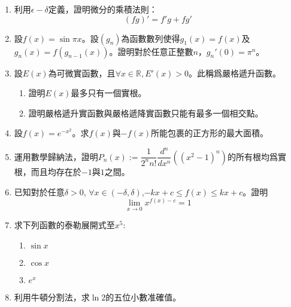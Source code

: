 \documentclass[12pt]{article}
\begin{document}
    \begin{enumerate}
        \item 利用$\epsilon-\delta$定義，證明微分的乘積法則：$$(fg)'=f'g+fg'$$
        \item 設$f(x)=\sin{\pi x}$。設$(g_n)$為函數數列使得$g_1(x)=f(x)$及$g_n(x)=f(g_{n-1}(x))$。證明對於任意正整數$n$，$g_n'(0)=\pi^n$。
        \item 設$E(x)$為可微實函數，且$\forall x\in \mathbb{R}, E'(x)>0$。此稱爲嚴格遞升函數。\begin{enumerate}
            \item 證明$E(x)$最多只有一個實根。
            \item 證明嚴格遞升實函數與嚴格遞降實函數只能有最多一個相交點。
        \end{enumerate}
        \item 設$f(x)=e^{-x^2}$。求$f(x)$與$-f(x)$所能包裹的正方形的最大面積。
        \item 運用數學歸納法，證明$P_n(x):=\dfrac{1}{2^n n!}\dfrac{d^n}{dx^n}((x^2-1)^n)$的所有根均爲實根，而且均存在於$-1$與$1$之間。
        \item 已知對於任意$\delta>0$, $\forall x\in (-\delta,\delta)$,$-kx+c\leq f(x)\leq kx+c$。證明$$\lim_{x\to 0}x^{f(x)-c}=1$$
        \item 求下列函數的泰勒展開式至$x^5$:\begin{enumerate}
            \item $\sin{x}$
            \item $\cos{x}$
            \item $e^x$
        \end{enumerate}
        \item 利用牛頓分割法，求$\ln{2}$的五位小數准確值。
    \end{enumerate}
\end{document}
